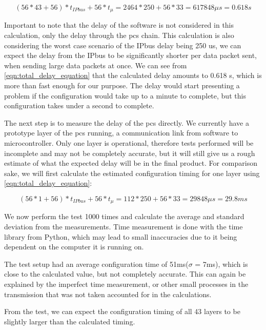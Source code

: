 \documentclass[main.tex]{subfiles}
\begin{document}
\begin{equation} \label{eqn:total_delay_equation}
(56*43+56)*t_{IPbus}+56*t_{\mu }= 2464 * 250 + 56*33 = 617 848\mu s = 0.618 s
\end{equation}

Important to note that the delay of the software is not considered in this calculation, only the delay through the \gls{pcs} chain. This calculation is also considering the worst case scenario of the IPbus delay being 250 us, we can expect the delay from the IPbus to be significantly shorter per data packet sent, when sending large data packets at once. We can see from \autoref{eqn:total_delay_equation} that the calculated delay amounts to 0.618 s, which is more than fast enough for our purpose. The delay would start presenting a problem if the configuration would take up to a minute to complete, but this configuration takes under a second to complete.

The next step is to measure the delay of the \gls{pcs} directly. We currently have a prototype layer of the \gls{pcs} running, a communication link from software to microcontroller. Only one layer is operational, therefore tests performed will be incomplete and may not be completely accurate, but it will still give us a rough estimate of what the expected delay will be in the final product. For comparison sake, we will first calculate the estimated configuration timing for one layer using \autoref{eqn:total_delay_equation}:

\begin{equation} \label{eqn:one_layer_delay}
(56*1+56)*t_{IPbus}+56*t_{\mu }= 112 * 250 + 56*33 =  29848\mu s = 29.8 ms
\end{equation}

We now perform the test 1000 times and calculate the average and standard deviation from the measurements. Time measurement is done with the time library from Python, which may lead to small inaccuracies due to it being dependent on the computer it is running on.

The test setup had an average configuration time of 51ms($\sigma$ = 7ms), which is close to the calculated value, but not completely accurate. This can again be explained by the imperfect time measurement, or other small processes in the transmission that was not taken accounted for in the calculations.

From the test, we can expect the configuration timing of all 43 layers to be slightly larger than the calculated timing.



\end{document}
